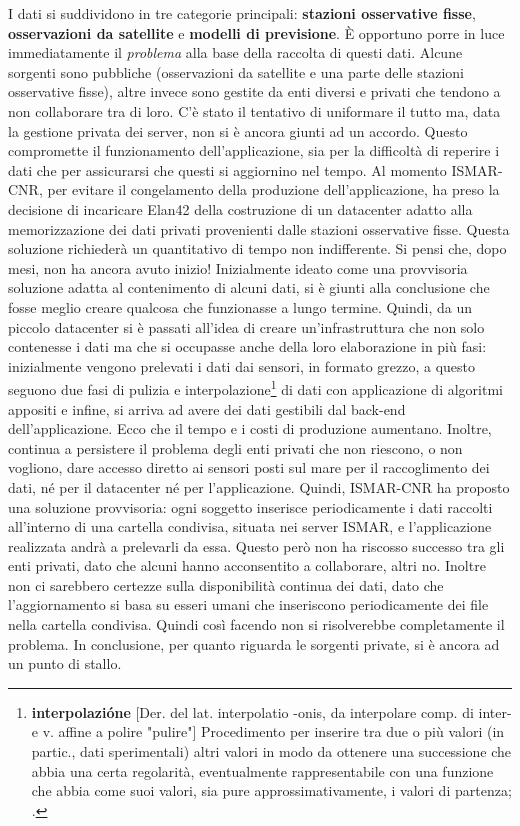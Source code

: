 \documentclass[./main.tex]{subfiles}
\begin{document}
I dati si suddividono in tre categorie principali: \textbf{stazioni osservative fisse}, \textbf{osservazioni da satellite} e \textbf{modelli di previsione}. È opportuno porre in luce immediatamente il \textit{problema} alla base della raccolta di questi dati. Alcune sorgenti sono pubbliche (osservazioni da satellite e una parte delle stazioni osservative fisse), altre invece sono gestite da enti diversi e privati che tendono a non collaborare tra di loro. C'è stato il tentativo di uniformare il tutto ma, data la gestione privata dei server, non si è ancora giunti ad un accordo. Questo compromette il funzionamento dell'applicazione, sia per la difficoltà di reperire i dati che per assicurarsi che questi si aggiornino nel tempo. Al momento ISMAR-CNR, per evitare il congelamento della produzione dell'applicazione, ha preso la decisione di incaricare Elan42 della costruzione di un datacenter adatto alla memorizzazione dei dati privati provenienti dalle stazioni osservative fisse. Questa soluzione richiederà un quantitativo di tempo non indifferente. Si pensi che, dopo mesi, non ha ancora avuto inizio! Inizialmente ideato come una provvisoria soluzione adatta al contenimento di alcuni dati, si è giunti alla conclusione che fosse meglio creare qualcosa che funzionasse a lungo termine. Quindi, da un piccolo datacenter si è passati all'idea di creare un'infrastruttura che non solo contenesse i dati ma che si occupasse anche della loro elaborazione in più fasi: inizialmente vengono prelevati i dati dai sensori, in formato grezzo, a questo seguono due fasi di pulizia e interpolazione\footnote{\textbf{interpolazióne} [Der. del lat. interpolatio -onis, da interpolare comp. di inter- e v. affine a polire "pulire"] Procedimento per inserire tra due o più valori (in partic., dati sperimentali) altri valori in modo da ottenere una successione che abbia una certa regolarità, eventualmente rappresentabile con una funzione che abbia come suoi valori, sia pure approssimativamente, i valori di partenza; \cite{treccani-interpolazione}.} di dati con applicazione di algoritmi appositi e infine, si arriva ad avere dei dati gestibili dal back-end dell'applicazione. Ecco che il tempo e i costi di produzione aumentano. Inoltre, continua a persistere il problema degli enti privati che non riescono, o non vogliono, dare accesso diretto ai sensori posti sul mare per il raccoglimento dei dati, né per il datacenter né per l'applicazione. Quindi, ISMAR-CNR ha proposto una soluzione provvisoria: ogni soggetto inserisce periodicamente i dati raccolti all'interno di una cartella condivisa, situata nei server ISMAR, e l'applicazione realizzata andrà a prelevarli da essa. Questo però non ha riscosso successo tra gli enti privati, dato che alcuni hanno acconsentito a collaborare, altri no. Inoltre non ci sarebbero certezze sulla disponibilità continua dei dati, dato che l'aggiornamento si basa su esseri umani che inseriscono periodicamente dei file nella cartella condivisa. Quindi così facendo non si risolverebbe completamente il problema. In conclusione, per quanto riguarda le sorgenti private, si è ancora ad un punto di stallo.\par
\end{document}
